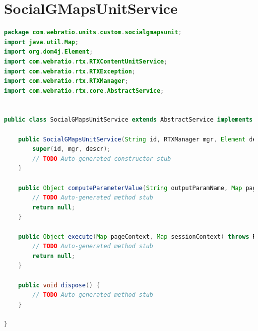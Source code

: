 \documentclass[oneside,12pt,a4paper]{memoir}%
\begin{document}
\section{SocialGMapsUnitService}
\begin{landscape}
\begin{lstlisting}[language=java, style=eclipse] 
package com.webratio.units.custom.socialgmapsunit;
import java.util.Map;
import org.dom4j.Element;
import com.webratio.rtx.RTXContentUnitService;
import com.webratio.rtx.RTXException;
import com.webratio.rtx.RTXManager;
import com.webratio.rtx.core.AbstractService;


public class SocialGMapsUnitService extends AbstractService implements RTXContentUnitService{

    public SocialGMapsUnitService(String id, RTXManager mgr, Element descr) throws RTXException {
        super(id, mgr, descr);
        // TODO Auto-generated constructor stub
    }

    public Object computeParameterValue(String outputParamName, Map pageContext, Map sessionContext) throws RTXException {
        // TODO Auto-generated method stub
        return null;
    }

    public Object execute(Map pageContext, Map sessionContext) throws RTXException {
        // TODO Auto-generated method stub
        return null;
    }

    public void dispose() {
        // TODO Auto-generated method stub
    }

}
\end{lstlisting}
\end{landscape}
\backmatter
\pagestyle{plain} 



\end{document}
